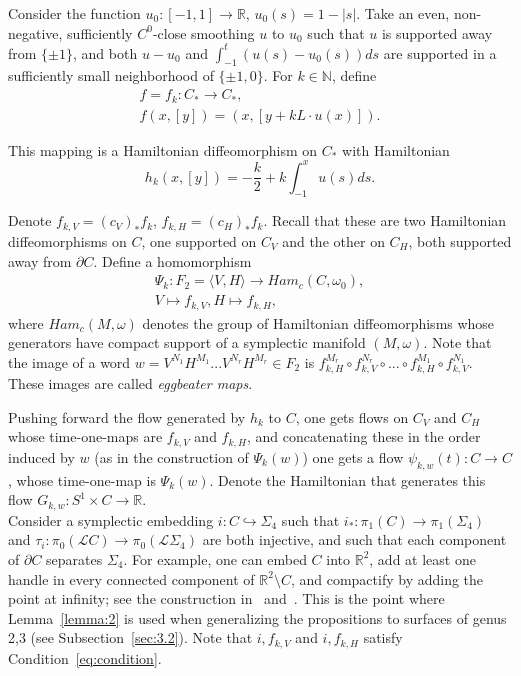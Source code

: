 \documentclass[11pt]{article}
\newenvironment{myequation}
    {
        \begin{equation*}
        \begin{gathered}
    }
    { 
        \end{gathered} 
        \end{equation*}
    }
\newcommand{\R}{\mathbb{R}}
\newcommand{\N}{\mathbb{N}}
\begin{document}
            Consider the function $u_0: [-1,1] \to \R$, $u_0(s) = 1 - |s|$. Take an even, non-negative, sufficiently $C^0$-close smoothing $u$ to $u_0$ such that $u$ is supported away from $\{\pm 1\}$, and both $u-u_0$ and $\int_{-1}^t (u(s)-u_0(s)) ds$ are supported in a sufficiently small neighborhood of $\{\pm 1, 0\}$. For $k \in \N$, define
            \begin{myequation}
                f = f_k: C_* \to C_* , \\
                f(x,[y]) = (x,[y + k L \cdot u(x)]) .
            \end{myequation}
            
            This mapping is a Hamiltonian diffeomorphism on $C_*$ with Hamiltonian
            \[
                h_k(x,[y]) = -\frac{k}{2} + k \int_{-1}^x u(s) ds .
            \]
            
            Denote $f_{k,V} = (c_V)_* f_k$, $f_{k,H} = (c_H)_* f_k$. Recall that these are two Hamiltonian diffeomorphisms on $C$, one supported on $C_V$ and the other on $C_H$, both supported away from $\partial C$. Define a homomorphism
            \begin{myequation}
                \Psi_k: F_2 = \langle V,H \rangle \to Ham_c(C,\omega_0) ,\\
                V \mapsto f_{k,V}, H \mapsto f_{k,H} ,
            \end{myequation}
            where $Ham_c(M,\omega)$ denotes the group of Hamiltonian diffeomorphisms whose generators have compact support of a symplectic manifold $(M,\omega)$.
            Note that the image of a word $w = V^{N_1} H^{M_1} ... V^{N_r} H^{M_r} \in F_2$ is $f_{k,H}^{M_r} \circ f_{k,V}^{N_r} \circ ... \circ f_{k,H}^{M_1} \circ f_{k,V}^{N_1}$. These images are called \textit{eggbeater maps}.
            
            Pushing forward the flow generated by $h_k$ to $C$, one gets flows on $C_V$ and $C_H$ whose time-one-maps are $f_{k,V}$ and $f_{k,H}$, and concatenating these in the order induced by $w$ (as in the construction of $\Psi_k(w)$) one gets a flow $\psi_{k,w}(t): C \to C$, whose time-one-map is $\Psi_k(w)$. Denote the Hamiltonian that generates this flow $G_{k,w}: S^1 \times C \to \R$. \\
            
            Consider a symplectic embedding $i: C \hookrightarrow \Sigma_4$ such that $i_*: \pi_1(C) \to \pi_1(\Sigma_4)$ and $\tau_i: \pi_0(\mathscr{L}C) \to \pi_0(\mathscr{L}\Sigma_4)$ are both injective, and such that each component of $\partial C$ separates $\Sigma_4$. For example, one can embed $C$ into $\R^2$, add at least one handle in every connected component of $\R^2 \setminus C$, and compactify by adding the point at infinity; see the construction in~\cite{PS14} and~\cite{10}. This is the point where Lemma~\ref{lemma:2} is used when generalizing the propositions to surfaces of genus 2,3 (see Subsection~\ref{sec:3.2}). Note that $i, f_{k,V}$ and $i, f_{k,H}$ satisfy Condition~\ref{eq:condition}. \\
            
\end{document}
